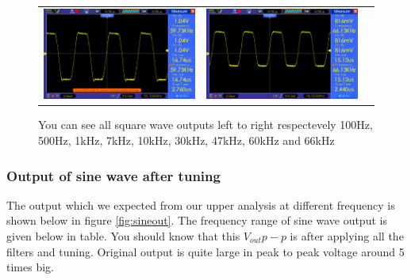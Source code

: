 \documentclass[14pt,a4paper]{extarticle}
\begin{document}
\begin{figure}[H]
\begin{tabular}{ccc}
    \includegraphics[width=0.32\linewidth]{imgs/square60k.png}&
    \includegraphics[width=0.32\linewidth]{imgs/square66k.png}
\end{tabular}
\vspace{0.2cm}
\caption{You can see all square wave outputs left to right respectevely 100Hz, 500Hz, 1kHz, 7kHz, 10kHz, 30kHz, 47kHz, 60kHz and 66kHz}
\label{fig:filters}
\end{figure}

\subsubsection{Output of sine wave after tuning}
\label{sec:org80422f9}
The output which we expected from our upper analysis at different frequency is shown below in figure \ref{fig:sineout}. The frequency range of sine wave output is given below in table. You should know that this \(V_{out}{p-p}\) is after applying all the filters and tuning. Original output is quite large in peak to peak voltage around 5 times big.
\end{document}
